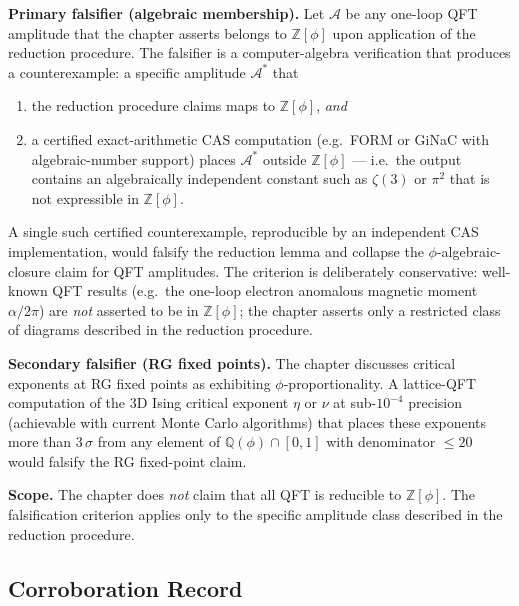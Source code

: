 \medskip
\noindent\textbf{Primary falsifier (algebraic membership).}
Let $\mathcal{A}$ be any one-loop QFT amplitude that the chapter
asserts belongs to $\mathbb{Z}[\phi]$ upon application of the
reduction procedure.  The falsifier is a computer-algebra
verification that produces a counterexample: a specific amplitude
$\mathcal{A}^*$ that
\begin{enumerate}
  \item the reduction procedure claims maps to $\mathbb{Z}[\phi]$,
        \emph{and}
  \item a certified exact-arithmetic CAS computation (e.g.\ FORM or
        GiNaC with algebraic-number support) places
        $\mathcal{A}^*$ outside $\mathbb{Z}[\phi]$ — i.e.\ the output
        contains an algebraically independent constant such as
        $\zeta(3)$ or $\pi^2$ that is not expressible in $\mathbb{Z}[\phi]$.
\end{enumerate}
A single such certified counterexample, reproducible by an independent
CAS implementation, would falsify the reduction lemma and collapse the
$\phi$-algebraic-closure claim for QFT amplitudes.  The criterion is
deliberately conservative: well-known QFT results (e.g.\ the
one-loop electron anomalous magnetic moment $\alpha/2\pi$) are
\emph{not} asserted to be in $\mathbb{Z}[\phi]$; the chapter asserts
only a restricted class of diagrams described in the reduction
procedure.

\medskip
\noindent\textbf{Secondary falsifier (RG fixed points).}
The chapter discusses critical exponents at RG fixed points as
exhibiting $\phi$-proportionality.  A lattice-QFT computation of the
3D Ising critical exponent $\eta$ or $\nu$ at sub-$10^{-4}$ precision
(achievable with current Monte Carlo algorithms) that places these
exponents more than $3\,\sigma$ from any element of
$\mathbb{Q}(\phi) \cap [0,1]$ with denominator $\leq 20$ would
falsify the RG fixed-point claim.

\medskip
\noindent\textbf{Scope.}
The chapter does \emph{not} claim that all QFT is reducible to
$\mathbb{Z}[\phi]$.  The falsification criterion applies only to the
specific amplitude class described in the reduction procedure.

\subsection{Corroboration Record}

